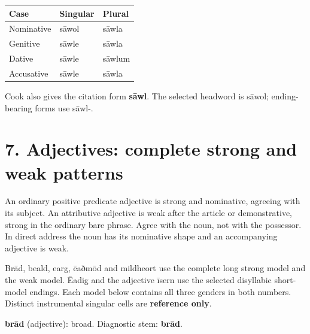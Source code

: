 \par\begingroup
\fontsize{10.5}{13.2}\selectfont
\setlength{\LTleft}{0pt}\setlength{\LTright}{\fill}
\noindent
\begin{tabular}{@{}>{\raggedright\arraybackslash}p{39.46mm}>{\raggedright\arraybackslash}p{39.46mm}>{\raggedright\arraybackslash}p{39.46mm}@{}}
\toprule
\textbf{Case} & \textbf{Singular} & \textbf{Plural} \\
\midrule
Nominative & sāwol & sāwla \\
Genitive & sāwle & sāwla \\
Dative & sāwle & sāwlum \\
Accusative & sāwle & sāwla \\
\bottomrule
\end{tabular}
\par\endgroup

Cook also gives the citation form \textbf{sāwl}. The selected headword is sāwol; ending-bearing forms use sāwl-.

\section*{7. Adjectives: complete strong and weak patterns}

An ordinary positive predicate adjective is strong and nominative, agreeing with its subject. An attributive adjective is weak after the article or demonstrative, strong in the ordinary bare phrase. Agree with the noun, not with the possessor. In direct address the noun has its nominative shape and an accompanying adjective is weak.

Brād, beald, earg, ēaðmōd and mildheort use the complete long strong model and the weak model. Ēadig and the adjective īsern use the selected disyllabic short-model endings. Each model below contains all three genders in both numbers. Distinct instrumental singular cells are \textbf{reference only}.

\textbf{brād} (adjective): broad. Diagnostic stem: \textbf{brād}.


